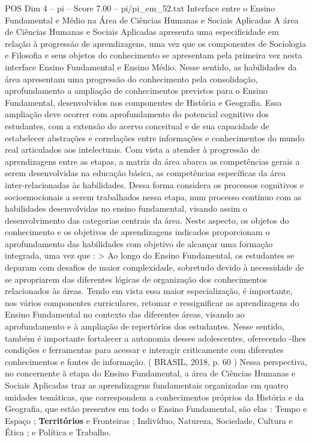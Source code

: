 \begin{textsample}{POS Dim 4 – pi – Score 7.00 – pi/pi\_em\_52.txt}  \label{ex:f4_pos_130}
Interface entre o Ensino Fundamental e Médio na Área de Ciências Humanas e Sociais Aplicadas A área de Ciências Humanas e Sociais Aplicadas apresenta uma especificidade em relação à progressão de aprendizagens, uma vez que os componentes de Sociologia e Filosofia e seus objetos do conhecimento se apresentam pela primeira vez nesta interface Ensino Fundamental e Ensino Médio.
Nesse sentido, as habilidades da área apresentam uma progressão do conhecimento pela consolidação, aprofundamento a ampliação de conhecimentos previstos para o Ensino Fundamental, desenvolvidos nos componentes de História e Geografia.
Essa ampliação deve ocorrer com aprofundamento do potencial cognitivo dos estudantes, com a extensão do acervo conceitual e de sua capacidade de estabelecer abstrações e correlações entre informações e conhecimentos do mundo real articulados aos intelectuais.
Com vista a atender à progressão de aprendizagens entre as etapas, a matriz da área abarca as competências gerais a serem desenvolvidas na educação básica, as competências específicas da área inter-relacionadas às habilidades.
Dessa forma considera os processos cognitivos e socioemocionais a serem trabalhados nessa etapa, num processo contínuo com as habilidades desenvolvidas no ensino fundamental, visando assim o desenvolvimento das categorias centrais da área.
Neste aspecto, os objetos do conhecimento e os objetivos de aprendizagens indicados proporcionam o aprofundamento das habilidades com objetivo de alcançar uma formação integrada, uma vez que : > Ao longo do Ensino Fundamental, os estudantes se deparam com desafios de maior complexidade, sobretudo devido à necessidade de se apropriarem das diferentes lógicas de organização dos conhecimentos relacionados às áreas.
Tendo em vista essa maior especialização, é importante, nos vários componentes curriculares, retomar e ressignificar as aprendizagens do Ensino Fundamental no contexto das diferentes áreas, visando ao aprofundamento e à ampliação de repertórios dos estudantes.
Nesse sentido, também é importante fortalecer a autonomia desses adolescentes, oferecendo -lhes condições e ferramentas para acessar e interagir criticamente com diferentes conhecimentos e fontes de informação. ( BRASIL, 2018, p. 60 ) Nessa perspectiva, no concernente à etapa do Ensino Fundamental, a área de Ciências Humanas e Sociais Aplicadas traz as aprendizagens fundamentais organizadas em quatro unidades temáticas, que correspondem a conhecimentos próprios da História e da Geografia, que estão presentes em todo o Ensino Fundamental, são elas : Tempo e Espaço ; \textbf{Territórios} e Fronteiras ; Indivíduo, Natureza, Sociedade, Cultura e Ética ; e Política e Trabalho.

\end{textsample}
